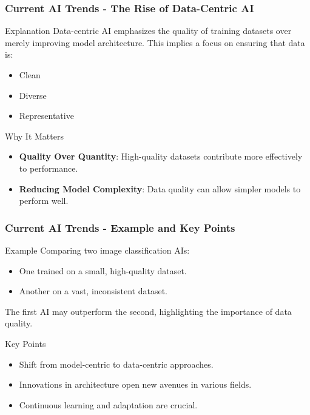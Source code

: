 \documentclass[aspectratio=169]{beamer}
\begin{document}
\begin{frame}[fragile]
    \frametitle{Current AI Trends - The Rise of Data-Centric AI}
    \begin{block}{Explanation}
        Data-centric AI emphasizes the quality of training datasets over merely improving model architecture. This implies a focus on ensuring that data is:
        \begin{itemize}
            \item Clean
            \item Diverse
            \item Representative
        \end{itemize}
    \end{block}

    \begin{block}{Why It Matters}
        \begin{itemize}
            \item \textbf{Quality Over Quantity}: High-quality datasets contribute more effectively to performance.
            \item \textbf{Reducing Model Complexity}: Data quality can allow simpler models to perform well.
        \end{itemize}
    \end{block}
\end{frame}

\begin{frame}[fragile]
    \frametitle{Current AI Trends - Example and Key Points}
    \begin{block}{Example}
        Comparing two image classification AIs:
        \begin{itemize}
            \item One trained on a small, high-quality dataset.
            \item Another on a vast, inconsistent dataset.
        \end{itemize}
        The first AI may outperform the second, highlighting the importance of data quality.
    \end{block}

    \begin{block}{Key Points}
        \begin{itemize}
            \item Shift from model-centric to data-centric approaches.
            \item Innovations in architecture open new avenues in various fields.
            \item Continuous learning and adaptation are crucial.
        \end{itemize}
    \end{block}
\end{frame}
\end{document}
